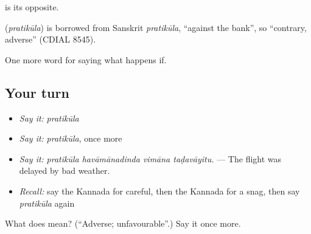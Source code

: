  is its opposite.

\begin{cousinweb}
\textbf{} (\emph{pratikūla}) is borrowed from Sanskrit \emph{pratikūla}, \textquotedblleft{}against the bank\textquotedblright{}, so \textquotedblleft{}contrary, adverse\textquotedblright{} (CDIAL 8545).
\end{cousinweb}

\begin{grammarlens}[title={What you've built}]
One more word for saying what happens if.
\end{grammarlens}

\subsection*{Your turn}
\begin{itemize}
\raggedright
  \item \emph{Say it:} \emph{pratikūla}
  \item \emph{Say it:} \emph{pratikūla}, once more
  \item \emph{Say it:} \emph{pratikūla havāmānadinda vimāna taḍavāyitu.} — The flight was delayed by bad weather.
  \item \emph{Recall:} say the Kannada for careful, then the Kannada for a snag, then say \emph{pratikūla} again
\end{itemize}

\begin{tcolorbox}[breakable,colback=teal!4,colframe=teal!35!black,title={Before you move on}]
What does  mean? (\textquotedblleft{}Adverse; unfavourable\textquotedblright{}.) Say it once more.
\end{tcolorbox}
